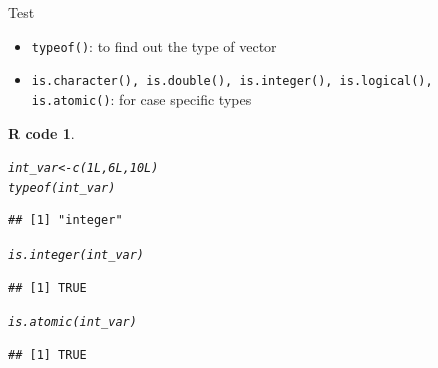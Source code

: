 \documentclass[11pt]{beamer}\usepackage[]{graphicx}\usepackage[]{color}
\makeatletter
\newcommand{\hlnum}[1]{\textcolor[rgb]{0.063,0.58,0.627}{#1}}%
\newcommand{\hlstd}[1]{\textcolor[rgb]{0.196,0.196,0.196}{#1}}%
\newcommand{\hlkwb}[1]{\textcolor[rgb]{0.627,0,0.314}{#1}}%
\newcommand{\hlkwd}[1]{\textcolor[rgb]{0.78,0.227,0.412}{#1}}%
\newenvironment{kframe}{%
 \def\at@end@of@kframe{}%
 \ifinner\ifhmode%
  \def\at@end@of@kframe{\end{minipage}}%
  \begin{minipage}{\columnwidth}%
 \fi\fi%
 \def\FrameCommand##1{\hskip\@totalleftmargin \hskip-\fboxsep
 \colorbox{shadecolor}{##1}\hskip-\fboxsep
     \hskip-\linewidth \hskip-\@totalleftmargin \hskip\columnwidth}%
 \MakeFramed {\advance\hsize-\width
   \@totalleftmargin\z@ \linewidth\hsize
   \@setminipage}}%
 {\par\unskip\endMakeFramed%
 \at@end@of@kframe}
\newenvironment{knitrout}{}{} %
\newtheorem{rcode}{R code}[section]
\newcommand{\code}[1]{\texttt{#1}}
\makeatother
\begin{document}
\begin{frame}[fragile]{Test}

\begin{itemize}
\item \code{typeof()}: to find out the type of vector
\item \code{is.character(), is.double(), is.integer(), is.logical(), is.atomic()}: for case specific types 
\end{itemize}
\pause
\begin{knitrout}\footnotesize
{}\color{fgcolor}\begin{kframe}
\begin{rcode}\label{unnamed-chunk-14}\begin{alltt}
\hlstd{int_var} \hlkwb{<-} \hlkwd{c}\hlstd{(}\hlnum{1L}\hlstd{,} \hlnum{6L}\hlstd{,} \hlnum{10L}\hlstd{)}
\hlkwd{typeof}\hlstd{(int_var)}
\end{alltt}
\begin{verbatim}
## [1] "integer"
\end{verbatim}
\begin{alltt}
\hlkwd{is.integer}\hlstd{(int_var)}
\end{alltt}
\begin{verbatim}
## [1] TRUE
\end{verbatim}
\begin{alltt}
\hlkwd{is.atomic}\hlstd{(int_var)}
\end{alltt}
\begin{verbatim}
## [1] TRUE
\end{verbatim}
\end{rcode}\end{kframe}
\end{knitrout}

\end{frame}
\end{document}
